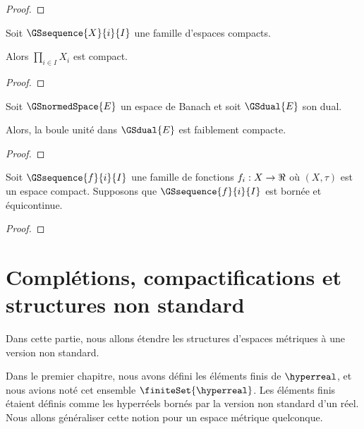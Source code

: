 \ifdefined\outputproof
\begin{proof}

\end{proof}
\fi

\begin{theorem} [de Tychonov]
	Soit $\GSsequence{X}{i}{I}$ une famille d'espaces compacts.

	Alors $\prod_{i \in I} X_{i}$ est compact.
\end{theorem}

\ifdefined\outputproof
\begin{proof}

\end{proof}
\fi

\begin{theorem} [d'Alaoglu]
	Soit $\GSnormedSpace{E}$ un espace de Banach et soit $\GSdual{E}$ son dual.

	Alors, la boule unité dans $\GSdual{E}$ est faiblement compacte.
\end{theorem}

\ifdefined\outputproof
\begin{proof}

\end{proof}
\fi

\begin{theorem} [d'Ascoli]
	Soit $\GSsequence{f}{i}{I}$ une famille de fonctions $f_{i} : X \rightarrow
	\real$ où $(X, \tau)$ est un espace compact. Supposons que
	$\GSsequence{f}{i}{I}$ est bornée et équicontinue.
\end{theorem}

\ifdefined\outputproof
\begin{proof}

\end{proof}
\fi

\section{Complétions, compactifications et structures non standard}

\label{completion_compactifitication_non_standard_hull}

Dans cette partie, nous allons étendre les structures d'espaces métriques à une
version non standard.

Dans le premier chapitre, nous avons défini les éléments finis de $\hyperreal$,
et nous avions noté cet ensemble $\finiteSet{\hyperreal}$. Les éléments finis
étaient définis comme les hyperréels bornés par la version non standard d'un
réel.
Nous allons généraliser cette notion pour un espace métrique quelconque.

